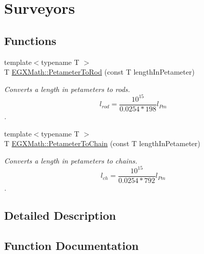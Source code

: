 \hypertarget{group___e_g_x_math-_conversions-_length_conversions-_s_i-_petameter-_surveyors}{}\section{Surveyors}
\label{group___e_g_x_math-_conversions-_length_conversions-_s_i-_petameter-_surveyors}
\subsection*{Functions}
\begin{DoxyCompactItemize}
\item 
{\footnotesize template$<$typename T $>$ }\\T \mbox{\hyperlink{group___e_g_x_math-_conversions-_length_conversions-_s_i-_petameter-_surveyors_gae7cef029bdb3e7ace9aa08e0183cc202}{E\+G\+X\+Math\+::\+Petameter\+To\+Rod}} (const T length\+In\+Petameter)
\begin{DoxyCompactList}\small\item\em Converts a length in petameters to rods. \[ l_{rod}= \frac{10^{15}}{0.0254 * 198} l_{Pm} \]. \end{DoxyCompactList}\item 
{\footnotesize template$<$typename T $>$ }\\T \mbox{\hyperlink{group___e_g_x_math-_conversions-_length_conversions-_s_i-_petameter-_surveyors_ga2d17d0bd003489d3d72d4ed1a2bd2f97}{E\+G\+X\+Math\+::\+Petameter\+To\+Chain}} (const T length\+In\+Petameter)
\begin{DoxyCompactList}\small\item\em Converts a length in petameters to chains. \[ l_{ch}= \frac{10^{15}}{0.0254 * 792} l_{Pm} \]. \end{DoxyCompactList}\end{DoxyCompactItemize}


\subsection{Detailed Description}


\subsection{Function Documentation}
\mbox{\label{group___e_g_x_math-_conversions-_length_conversions-_s_i-_petameter-_surveyors_ga2d17d0bd003489d3d72d4ed1a2bd2f97}} 
